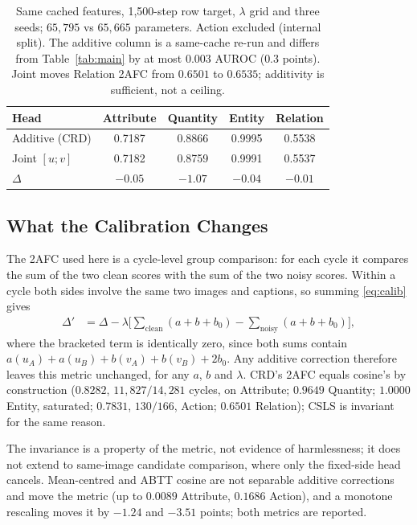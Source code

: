 \begin{table}[t]
\centering
\footnotesize
\setlength{\tabcolsep}{4pt}
\caption{Same cached features, 1,500-step row target, $\lambda$ grid and three seeds;
$65{,}795$ vs $65{,}665$ parameters. Action excluded (internal split). The additive
column is a same-cache re-run and differs from Table~\ref{tab:main} by at most
$0.003$ AUROC ($0.3$ points). Joint moves Relation 2AFC from $0.6501$ to
$0.6535$; additivity is sufficient, not a ceiling.}
\label{tab:joint}
\begin{tabular}{lcccc}
\toprule
Head & Attribute & Quantity & Entity & Relation \\
\midrule
Additive (CRD) & 0.7187 & 0.8866 & 0.9995 & 0.5538 \\
Joint $[u;v]$  & 0.7182 & 0.8759 & 0.9991 & 0.5537 \\
$\Delta$       & $-0.05$ & $-1.07$ & $-0.04$ & $-0.01$ \\
\bottomrule
\end{tabular}
\end{table}

\subsection{What the Calibration Changes}
\label{sec:analysis}
The 2AFC used here is a cycle-level group comparison: for each cycle it compares the
sum of the two clean scores with the sum of the two noisy scores. Within a cycle both
sides involve the same two images and captions, so summing \eqref{eq:calib} gives
\begin{equation}
\begin{aligned}
\Delta' &= \Delta
- \lambda\Big[\textstyle\sum_{\text{clean}}(a+b+b_0)
- \sum_{\text{noisy}}(a+b+b_0)\Big],
\end{aligned}
\end{equation}
where the bracketed term is identically zero, since both sums contain
$a(u_A)+a(u_B)+b(v_A)+b(v_B)+2b_0$. Any additive correction therefore leaves this
metric unchanged, for any $a$, $b$ and $\lambda$. CRD's 2AFC equals cosine's by
construction ($0.8282$, $11{,}827/14{,}281$ cycles, on Attribute; $0.9649$ Quantity;
$1.0000$ Entity, saturated; $0.7831$, $130/166$, Action; $0.6501$ Relation); CSLS is
invariant for the same reason.

The invariance is a property of the metric, not evidence of harmlessness; it does
not extend to same-image candidate comparison, where only the fixed-side head cancels.
Mean-centred and ABTT cosine are not separable additive corrections and move the
metric (up to $0.0089$ Attribute, $0.1686$ Action), and a monotone rescaling moves it
by $-1.24$ and $-3.51$ points; both metrics are reported.

